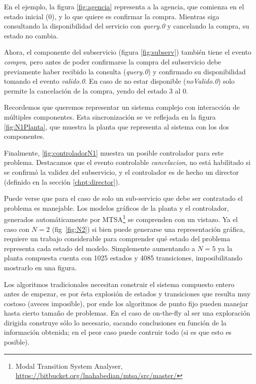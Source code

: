 En el ejemplo, la figura \ref{fig:agencia} representa a la agencia, que comienza en el estado inicial (0), y lo que quiere es confirmar la compra. Mientras siga consultando la disponibilidad del servicio con \textit{query.0} y cancelando la compra, su estado no cambia. 

Ahora, el componente del subservicio (figura \ref{fig:subserv}) también tiene el evento \textit{compra}, pero antes de poder confirmarse la compra del subservicio debe previamente haber recibido la consulta (\textit{query.0}) y confirmado su disponibilidad tomando el evento \textit{valido.0}. En caso de no estar disponible (\textit{noValido.0}) solo permite la cancelación de la compra, yendo del estado 3 al 0.

Recordemos que queremos representar un sistema complejo con interacción de múltiples componentes. Esta sincronización se ve reflejada en la figura \ref{fig:N1Planta}, que muestra la planta que representa al sistema con los dos componentes. 

Finalmente, \ref{fig:controladorN1} muestra un posible controlador para este problema. Destacamos que el evento controlable \textit{cancelacion}, no está habilitado si se confirmó la validez del subservicio, y el controlador es de hecho un director (definido en la sección \ref{chpt:director}). 

Puede verse que para el caso de solo un sub-servicio que debe ser contratado el problema es manejable. Los modelos gráficos de la planta y el controlador, generados automáticamente por MTSA\footnote{Modal Transition System Analyser, \href{https://bitbucket.org/lnahabedian/mtsa/src/master/^}{https://bitbucket.org/lnahabedian/mtsa/src/master/}} se comprenden con un vistazo. Ya el caso con $N=2$ (fig~\ref{fig:N2}) si bien puede generarse una representación gráfica, requiere un trabajo considerable para comprender qué estado del problema representa cada estado del modelo. Simplemente aumentando a $N=5$ ya la planta compuesta cuenta con 1025 estados y 4085 transiciones, imposibilitando mostrarlo en una figura. 

Los algoritmos tradicionales necesitan construir el sistema compuesto entero antes de empezar, es por ésta explosión de estados y transiciones que resulta muy costoso (aveces imposible), por ende los algoritmos de punto fijo pueden manejar hasta cierto tamaño de problemas. En el caso de on-the-fly al ser una exploración dirigida construye sólo lo necesario, sacando conclusiones en función de la información obtenida; en el peor caso puede contruir todo (si es que esto es posible).

